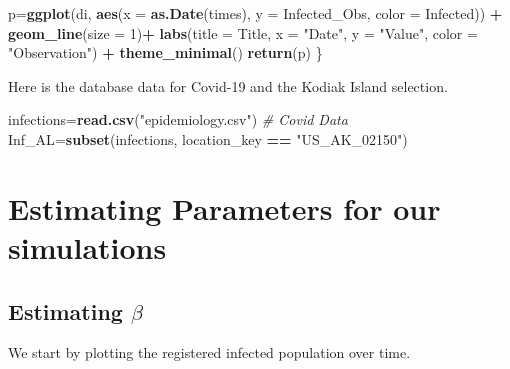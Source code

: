 \documentclass[
]{article}
\newenvironment{Shaded}{\begin{snugshade}}{\end{snugshade}}
\newcommand{\AttributeTok}[1]{\textcolor[rgb]{0.13,0.29,0.53}{#1}}
\newcommand{\CommentTok}[1]{\textcolor[rgb]{0.56,0.35,0.01}{\textit{#1}}}
\newcommand{\DecValTok}[1]{\textcolor[rgb]{0.00,0.00,0.81}{#1}}
\newcommand{\FunctionTok}[1]{\textcolor[rgb]{0.13,0.29,0.53}{\textbf{#1}}}
\newcommand{\NormalTok}[1]{#1}
\newcommand{\OtherTok}[1]{\textcolor[rgb]{0.56,0.35,0.01}{#1}}
\newcommand{\SpecialCharTok}[1]{\textcolor[rgb]{0.81,0.36,0.00}{\textbf{#1}}}
\newcommand{\StringTok}[1]{\textcolor[rgb]{0.31,0.60,0.02}{#1}}
\begin{document}
\begin{Shaded}
\begin{Highlighting}[]
\NormalTok{  p}\OtherTok{=}\FunctionTok{ggplot}\NormalTok{(di, }\FunctionTok{aes}\NormalTok{(}\AttributeTok{x =} \FunctionTok{as.Date}\NormalTok{(times), }\AttributeTok{y =}\NormalTok{ Infected\_Obs, }\AttributeTok{color =}\NormalTok{ Infected)) }\SpecialCharTok{+}
  \FunctionTok{geom\_line}\NormalTok{(}\AttributeTok{size =} \DecValTok{1}\NormalTok{)}\SpecialCharTok{+}
  \FunctionTok{labs}\NormalTok{(}\AttributeTok{title =}\NormalTok{ Title,}
       \AttributeTok{x =} \StringTok{"Date"}\NormalTok{, }\AttributeTok{y =} \StringTok{"Value"}\NormalTok{, }\AttributeTok{color =} \StringTok{"Observation"}\NormalTok{) }\SpecialCharTok{+}
  \FunctionTok{theme\_minimal}\NormalTok{()}
  \FunctionTok{return}\NormalTok{(p)}
\NormalTok{\}}
\end{Highlighting}
\end{Shaded}

Here is the database data for Covid-19 and the Kodiak Island selection.

\begin{Shaded}
\begin{Highlighting}[]
\NormalTok{infections}\OtherTok{=}\FunctionTok{read.csv}\NormalTok{(}\StringTok{"epidemiology.csv"}\NormalTok{) }\CommentTok{\# Covid Data}
\NormalTok{Inf\_AL}\OtherTok{=}\FunctionTok{subset}\NormalTok{(infections, location\_key }\SpecialCharTok{==} \StringTok{"US\_AK\_02150"}\NormalTok{)}
\end{Highlighting}
\end{Shaded}

\section{Estimating Parameters for our
simulations}\label{estimating-parameters-for-our-simulations}

\subsection{\texorpdfstring{Estimating
\(\beta\)}{Estimating \textbackslash beta}}\label{estimating-beta}

We start by plotting the registered infected population over time.

\begin{Shaded}
\end{Shaded}
\end{document}
